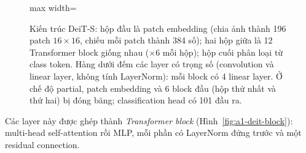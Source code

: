 \documentclass[a4paper,12pt]{article}
\begin{document}
\begin{figure}[!htb]
\begin{adjustbox}{max width=\linewidth}
    \end{adjustbox}
    \caption{Kiến trúc DeiT-S: hộp đầu là patch embedding (chia ảnh thành 196 patch \(16{\times}16\), chiếu mỗi patch thành 384 số); hai hộp giữa là 12 Transformer block giống nhau (\(\times 6\) mỗi hộp); hộp cuối phân loại từ class token. Hàng dưới đếm các layer có trọng số (convolution và linear layer, không tính LayerNorm): mỗi block có 4 linear layer. Ở chế độ partial, patch embedding và 6 block đầu (hộp thứ nhất và thứ hai) bị đóng băng; classification head có 101 đầu ra.}
    \label{fig:a1-deit}
\end{figure}

Các layer này được ghép thành \emph{Transformer block} (Hình~\ref{fig:a1-deit-block}): multi-head self-attention rồi MLP, mỗi phần có LayerNorm đứng trước và một residual connection.
\end{document}
